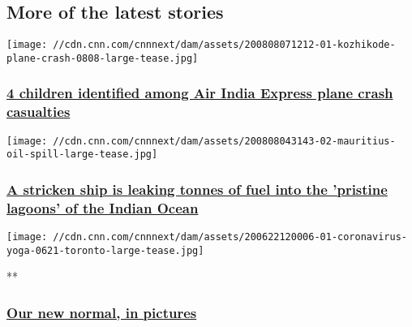 \hypertarget{more-of-the-latest-stories-}{%
\subsection{More of the latest
stories~}\label{more-of-the-latest-stories-}}

\href{/2020/08/08/asia/air-india-express-plane-crash-kerala-intl/index.html}{}

\texttt{[image: //cdn.cnn.com/cnnnext/dam/assets/200808071212-01-kozhikode-plane-crash-0808-large-tease.jpg]}

\hypertarget{4-children-identified-among-air-india-express-plane-crash-casualties-2}{%
\subsubsection{\texorpdfstring{\href{/2020/08/08/asia/air-india-express-plane-crash-kerala-intl/index.html}{4
children identified among Air India Express plane crash
casualties}}{4 children identified among Air India Express plane crash casualties}}\label{4-children-identified-among-air-india-express-plane-crash-casualties-2}}

\href{/2020/08/08/world/mauritius-oil-spill-scli-intl/index.html}{}

\texttt{[image: //cdn.cnn.com/cnnnext/dam/assets/200808043143-02-mauritius-oil-spill-large-tease.jpg]}

\hypertarget{a-stricken-ship-is-leaking-tonnes-of-fuel-into-the-pristine-lagoons-of-the-indian-ocean}{%
\subsubsection{\texorpdfstring{\href{/2020/08/08/world/mauritius-oil-spill-scli-intl/index.html}{A
stricken ship is leaking tonnes of fuel into the 'pristine lagoons' of
the Indian
Ocean}}{A stricken ship is leaking tonnes of fuel into the 'pristine lagoons' of the Indian Ocean}}\label{a-stricken-ship-is-leaking-tonnes-of-fuel-into-the-pristine-lagoons-of-the-indian-ocean}}

\href{/2020/05/20/world/gallery/new-normal-coronavirus/index.html}{}

\texttt{[image: //cdn.cnn.com/cnnnext/dam/assets/200622120006-01-coronavirus-yoga-0621-toronto-large-tease.jpg]}

**

\hypertarget{our-new-normal-in-pictures}{%
\subsubsection{\texorpdfstring{\href{/2020/05/20/world/gallery/new-normal-coronavirus/index.html}{Our
new normal, in
pictures}}{Our new normal, in pictures}}\label{our-new-normal-in-pictures}}

